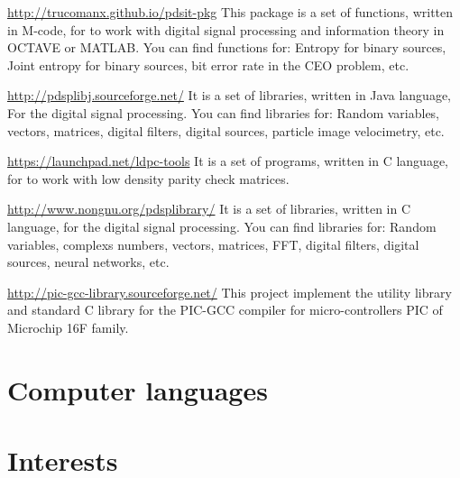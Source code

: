 \documentclass[11pt,a4paper,sans]{moderncv} %
\begin{document}
			{\url{http://trucomanx.github.io/pdsit-pkg}}
			{}{}
			{This package is a set of functions, written in M-code, for to work
			with digital signal processing and information theory
			in OCTAVE or MATLAB. You can find functions for:
			Entropy for binary sources, Joint entropy for binary sources,
			bit error rate in the CEO problem, etc. }
			
			{\url{http://pdsplibj.sourceforge.net/}}
			{}{}
			{It is a set of libraries, written in Java language, For
			the digital signal processing. You can find
			libraries for: Random variables,
			vectors, matrices, digital filters,
			digital sources, particle image velocimetry, etc.}

			{\url{https://launchpad.net/ldpc-tools}}
			{}{}
			{It is a set of programs, written in C language, for
			to work with low density parity check matrices.}
			

			{\url{http://www.nongnu.org/pdsplibrary/}}
			{}{}
			{It is a set of libraries, written in C language, for 
			the digital signal processing. You can find libraries for:
			Random variables, complexs numbers, vectors, matrices, FFT,
			digital filters, digital sources, neural networks, etc.}

			{\url{http://pic-gcc-library.sourceforge.net/}}
			{}{}
			{This project implement the utility library and 
			standard C library for the PIC-GCC compiler for 
			micro-controllers PIC of Microchip 16F family. }


\section{Computer languages}



\section{Interests}

\renewcommand{\listitemsymbol}{-~} %
\end{document}
